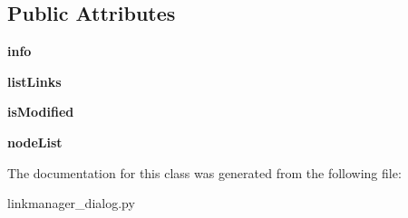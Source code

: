 \subsection*{Public Attributes}
\begin{DoxyCompactItemize}
\item 
\hypertarget{class_sim_g_d_c_1_1linkmanager__dialog_1_1_link_manager_dialog_ac4266a788b7474cdee91753d652cf01e}{}{\bfseries info}\label{class_sim_g_d_c_1_1linkmanager__dialog_1_1_link_manager_dialog_ac4266a788b7474cdee91753d652cf01e}

\item 
\hypertarget{class_sim_g_d_c_1_1linkmanager__dialog_1_1_link_manager_dialog_a733bc96c3cf5fb10ed399018eff966d7}{}{\bfseries list\+Links}\label{class_sim_g_d_c_1_1linkmanager__dialog_1_1_link_manager_dialog_a733bc96c3cf5fb10ed399018eff966d7}

\item 
\hypertarget{class_sim_g_d_c_1_1linkmanager__dialog_1_1_link_manager_dialog_ad295d74c12ccdf731f263320dcaea77e}{}{\bfseries is\+Modified}\label{class_sim_g_d_c_1_1linkmanager__dialog_1_1_link_manager_dialog_ad295d74c12ccdf731f263320dcaea77e}

\item 
\hypertarget{class_sim_g_d_c_1_1linkmanager__dialog_1_1_link_manager_dialog_ae5659410a38ee189239ea4dc4a6dd0c2}{}{\bfseries node\+List}\label{class_sim_g_d_c_1_1linkmanager__dialog_1_1_link_manager_dialog_ae5659410a38ee189239ea4dc4a6dd0c2}

\end{DoxyCompactItemize}


The documentation for this class was generated from the following file\+:\begin{DoxyCompactItemize}
\item 
linkmanager\+\_\+dialog.\+py\end{DoxyCompactItemize}
